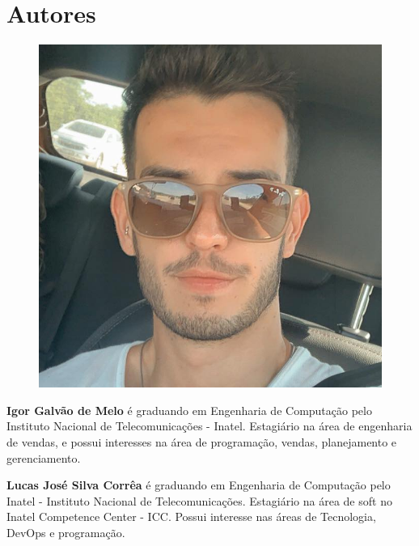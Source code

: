 \section*{Autores}

\begin{figure}
\includegraphics[width=\linewidth]{figuras/autor_igor.jpg}
\end{figure}

\textbf{Igor Galvão de Melo} é graduando em Engenharia de Computação pelo Instituto Nacional de Telecomunicações - Inatel. Estagiário na área de engenharia de vendas, e possui interesses na área de programação, vendas, planejamento e gerenciamento.

\begin{figure}
\end{figure}

   \textbf{Lucas José Silva Corrêa} é graduando em Engenharia de Computação pelo Inatel - Instituto Nacional de Telecomunicações. Estagiário na área de soft no Inatel Competence Center - ICC. Possui interesse nas áreas de Tecnologia, DevOps e programação.\newline

